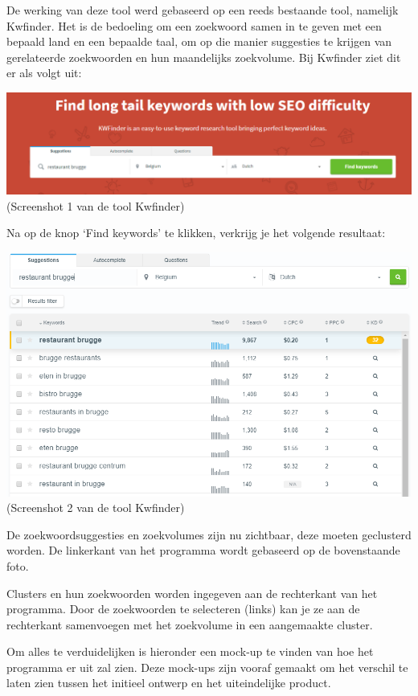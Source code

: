 De werking van deze tool werd gebaseerd op een reeds bestaande tool, namelijk Kwfinder. Het is de bedoeling om een zoekwoord samen in te geven met een bepaald land en een bepaalde taal, om op die manier suggesties te krijgen van gerelateerde zoekwoorden en hun maandelijks zoekvolume. Bij Kwfinder ziet dit er als volgt uit: 

\includegraphics[width=\linewidth]{Bachelorproef/bachelor/img/kwfindervoorbeeld.png}
(Screenshot 1 van de tool Kwfinder)

Na op de knop ‘Find keywords’ te klikken, verkrijg je het volgende resultaat: 

\includegraphics[width=\linewidth]{Bachelorproef/bachelor/img/kwfindervoorbeeld2.png}
(Screenshot 2 van de tool Kwfinder)

De zoekwoordsuggesties en zoekvolumes zijn nu zichtbaar, deze moeten geclusterd worden. De linkerkant van het programma wordt gebaseerd op de bovenstaande foto. 

Clusters en hun zoekwoorden worden ingegeven aan de rechterkant van het programma. Door de zoekwoorden te selecteren (links) kan je ze aan de rechterkant samenvoegen met het zoekvolume in een aangemaakte cluster. 

Om alles te verduidelijken is hieronder een mock-up te vinden van hoe het programma er uit zal zien. Deze mock-ups zijn vooraf gemaakt om het verschil te laten zien tussen het initieel ontwerp en het uiteindelijke product. 

